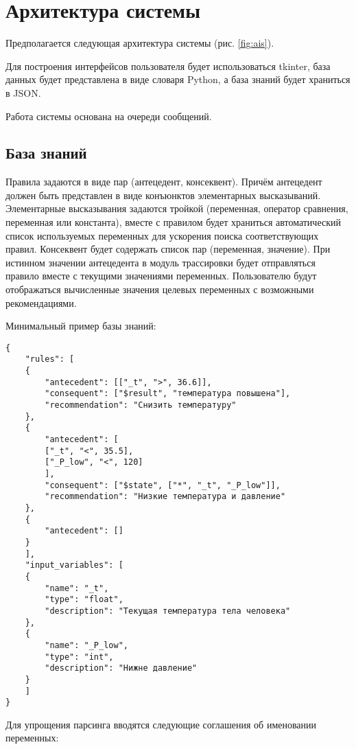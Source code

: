 \section{Архитектура системы}

Предполагается следующая архитектура системы (рис. \ref{fig:ais}).


Для построения интерфейсов пользователя будет использоваться tkinter, база данных будет представлена в виде словаря Python, а база знаний будет храниться в JSON.

Работа системы основана на очереди сообщений.

\subsection{База знаний}

Правила задаются в виде пар (антецедент, консеквент).
Причём антецедент должен быть представлен в виде конъюнктов элементарных высказываний.
Элементарные высказывания задаются тройкой (переменная, оператор сравнения, переменная или константа),
вместе с правилом будет храниться автоматический список используемых переменных для ускорения поиска соответствующих правил.
Консеквент будет содержать список пар (переменная, значение).
При истинном значении антецедента в модуль трассировки будет отправляться правило вместе с текущими значениями переменных.
Пользователю будут отображаться вычисленные значения целевых переменных с возможными рекомендациями.

Минимальный пример базы знаний:


\begin{lstlisting}
{
	"rules": [
	{
		"antecedent": [["_t", ">", 36.6]],
		"consequent": ["$result", "температура повышена"],
		"recommendation": "Снизить температуру"
	},
	{
		"antecedent": [
		["_t", "<", 35.5],
		["_P_low", "<", 120]
		],
		"consequent": ["$state", ["*", "_t", "_P_low"]],
		"recommendation": "Низкие температура и давление"
	},
	{
		"antecedent": []
	}
	],
	"input_variables": [
	{
		"name": "_t",
		"type": "float",
		"description": "Текущая температура тела человека"
	},
	{
		"name": "_P_low",
		"type": "int",
		"description": "Нижне давление"
	}
	]
}
\end{lstlisting}

Для упрощения парсинга вводятся следующие соглашения об именовании переменных:

